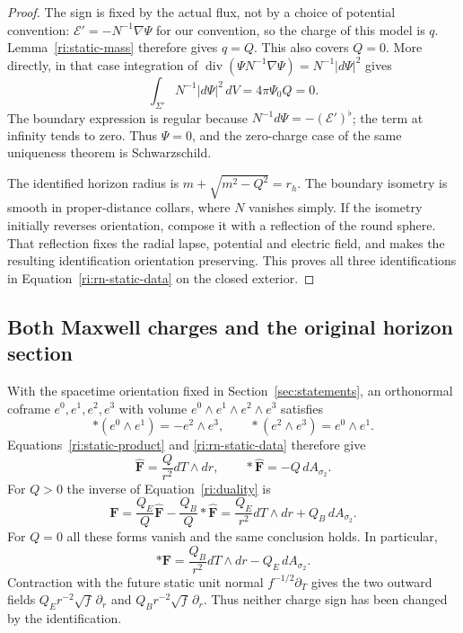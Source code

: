 \begin{proof}
The sign is fixed by the actual flux, not by a choice of potential
convention: $\mathcal E'=-N^{-1}\nabla\Psi$ for our convention,
so the charge of this model is $q$.  Lemma~\ref{ri:static-mass}
therefore gives $q=Q$.  This also covers $Q=0$.  More directly,
in that case integration of
$\operatorname{div}(\Psi N^{-1}\nabla\Psi)
=N^{-1}|d\Psi|^2$ gives
\[
 \int_{\Sigma'}N^{-1}|d\Psi|^2\,dV=4\pi\Psi_0 Q=0.
\]
The boundary expression is regular because
$N^{-1}d\Psi=-(\mathcal E')^\flat$; the term at infinity tends
to zero.  Thus $\Psi=0$, and the zero-charge case of the same
uniqueness theorem is Schwarzschild.

The identified horizon radius is
$m+\sqrt{m^2-Q^2}=r_h$.  The boundary isometry is smooth in
proper-distance collars, where $N$ vanishes simply.  If the
isometry initially reverses orientation, compose it with a
reflection of the round sphere.  That reflection fixes the radial
lapse, potential and electric field, and makes the resulting
identification orientation preserving.  This proves all three
identifications in Equation~\eqref{ri:rn-static-data} on the
closed exterior.
\end{proof}

\subsection{Both Maxwell charges and the original horizon section}
\label{ri:original-subsection}

With the spacetime orientation fixed in Section~\ref{sec:statements},
an orthonormal coframe
$e^0,e^1,e^2,e^3$ with volume $e^0\wedge e^1\wedge e^2\wedge e^3$
satisfies
\[
 *(e^0\wedge e^1)=-e^2\wedge e^3,\qquad
 *(e^2\wedge e^3)=e^0\wedge e^1.
\]
Equations~\eqref{ri:static-product} and
\eqref{ri:rn-static-data} therefore give
\[
 \widehat{\mathbf F}=\frac Q{r^2}dT\wedge dr,
 \qquad *\widehat{\mathbf F}=-Q\,dA_{\sigma_2}.
\]
For $Q>0$ the inverse of Equation~\eqref{ri:duality} is
\begin{equation}
\label{ri:inverse-duality}
 \mathbf F=\frac{Q_E}{Q}\widehat{\mathbf F}
              -\frac{Q_B}{Q}*\widehat{\mathbf F}
       =\frac{Q_E}{r^2}dT\wedge dr+Q_B\,dA_{\sigma_2}.
\end{equation}
For $Q=0$ all these forms vanish and the same conclusion holds.
In particular,
\[
 *\mathbf F=\frac{Q_B}{r^2}dT\wedge dr-Q_E\,dA_{\sigma_2}.
\]
Contraction with the future static unit normal $f^{-1/2}\partial_T$
gives the two outward fields $Q_Er^{-2}\sqrt f\,\partial_r$ and
$Q_Br^{-2}\sqrt f\,\partial_r$.  Thus neither charge sign has been
changed by the identification.

